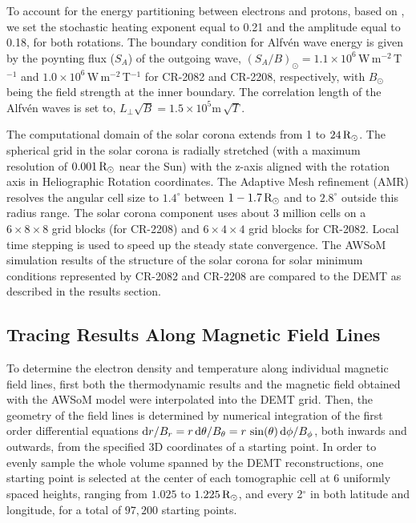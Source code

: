 \documentclass[namedreferences]{solarphysics}
\newcommand{\mdeg}{^\circ}
\newcommand{\mrsun}{{\rm R_\odot}}
\begin{document}
\begin{article}
To account for the energy partitioning between electrons and protons, based on \citet{Cha2011}, we set the stochastic heating exponent {equal to} 0.21 and the amplitude equal to {0.18, for both} rotations. The boundary condition for Alfv\'{e}n wave energy is given by the {poynting flux ($S_{A}$)} of the outgoing {wave, $({S_{A}/}{B})_{\odot} = 1.1\times 10^{6}$\,W\,m$^{-2}$\,T$^{-1}$ and $1.0\times 10^{6}$\,W\,m$^{-2}$\,T$^{-1}$ for CR-2082 and CR-2208, respectively, with $B_{\odot}$ being the field} strength at the inner boundary. The correlation length of the Alfv\'{e}n waves is set {to, $L_{\perp} \sqrt{B} = 1.5 \times 10^{5}$m\,$\sqrt{T}$.}

{The computational domain of the solar corona} extends from 1 to {$24\,\mrsun$}. The spherical grid in the solar corona is radially stretched (with a maximum resolution {of $0.001\,\mrsun$} near the Sun) with the z-axis aligned with the rotation axis in Heliographic Rotation coordinates. The Adaptive Mesh refinement (AMR) resolves the angular cell size to $1.4\mdeg$ between $1 - 1.7\,\mrsun$ and to $2.8\mdeg$ outside this radius range. The solar corona component uses about 3 million cells on a $6 \times 8 \times 8$ grid blocks (for CR-2208) and $6 \times 4 \times 4$ grid blocks for CR-2082. Local time stepping is used to speed up the steady state convergence. The AWSoM simulation results of the structure of the solar corona for solar minimum conditions represented by CR-2082 and CR-2208 are compared to the DEMT as described in the results section.


\subsection{{Tracing Results Along Magnetic Field Lines}}\label{trace} 

{To determine} the electron density and temperature along individual magnetic field lines, first both the thermodynamic results and the magnetic field obtained with the AWSoM model were interpolated into the DEMT grid. Then, the geometry of the field lines is determined by numerical integration of the first order differential equations  ${\rm d}r/B_r = {r\,{\rm d}\theta}/B_\theta = r\,\sin(\theta)\,{\rm d}\phi/B_\phi$, both inwards and outwards, from the specified 3D coordinates of a starting point. In order to evenly sample the whole volume spanned by the DEMT reconstructions, one starting point is selected at the center of each tomographic cell at 6 uniformly spaced heights, ranging from $1.025$ to $1.225\,\mrsun$, and every 2$^\circ$ in both latitude and longitude, {for a total of $97,200$ starting points.}


\end{article}
\end{document}
